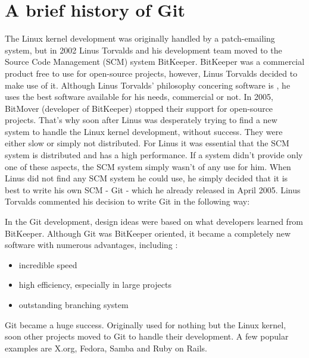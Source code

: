 \section {A brief history of Git}\label{githistory}

The Linux kernel development was originally handled by a patch-emailing system, but in 2002 Linus Torvalds and his development team moved to the Source Code Management (SCM) system BitKeeper. BitKeeper was a commercial product free to use for open-source projects, however, Linus Torvalds decided to make use of it. Although Linus Torvalds' philosophy concering software is  \cite{googletechtalk2007}, he uses the best software available for his needs, commercial or not.
In 2005, BitMover (developer of BitKeeper) stopped their support for open-source projects. That's why soon after Linus was desperately trying to find a new system to handle the Linux kernel development, without success. They were either slow or simply not distributed. For Linus it was essential that the SCM system is distributed and has a high performance. If a system didn't provide only one of these aspects, the SCM system simply wasn't of any use for him. When Linus did not find any SCM system he could use, he simply decided that it is best to write his own SCM - Git - which he already released in April 2005. Linus Torvalds commented his decision to write Git in the following way: 

 \cite{googletechtalk2007}

In the Git development, design ideas were based on what developers learned from BitKeeper. Although Git was BitKeeper oriented, it became a completely new software with numerous advantages, including \cite{gitpro2009}:

\begin{itemize}
	\item incredible speed
	\item high efficiency, especially in large projects
	\item outstanding branching system
\end{itemize}

Git became a huge success. Originally used for nothing but the Linux kernel, soon other projects moved to Git to handle their development. A few popular examples are X.org, Fedora, Samba and Ruby on Rails. \cite{gitinternals2008}
